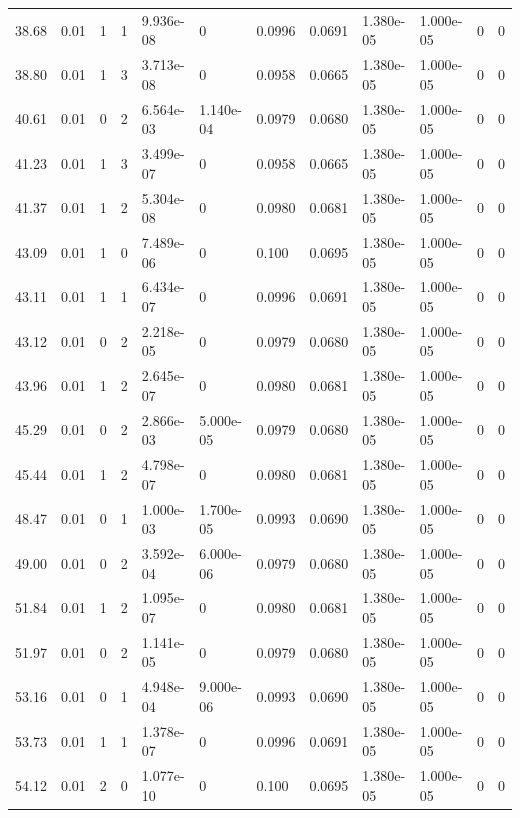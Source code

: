\documentclass[preview]{standalone}
\begin{document}
{{{\begin{tabular}{L{1.2cm}C{1.2cm} C{0.3cm}C{0.5cm} C{1.4cm}C{1.4cm} C{1.4cm}C{1.4cm} C{1.6cm}C{1.6cm} C{1.6cm}C{1.6cm}}
  38.68  &  0.01  & 1     &  1 &  9.936e-08  & 0  &  0.0996&   0.0691& 1.380e-05 & 1.000e-05   &  0 & 0  \\ 
  38.80  &  0.01  & 1     &  3 &  3.713e-08  & 0  &  0.0958&   0.0665& 1.380e-05 & 1.000e-05   &  0 & 0  \\ 
  40.61  &  0.01  & 0     &  2 &  6.564e-03  & 1.140e-04  &  0.0979&   0.0680& 1.380e-05 & 1.000e-05   &  0 & 0  \\ 
  41.23  &  0.01  & 1     &  3 &  3.499e-07  & 0  &  0.0958&   0.0665& 1.380e-05 & 1.000e-05   &  0 & 0  \\ 
  41.37  &  0.01  & 1     &  2 &  5.304e-08  & 0  &  0.0980&   0.0681& 1.380e-05 & 1.000e-05   &  0 & 0  \\ 
  43.09  &  0.01  & 1     &  0 &  7.489e-06  & 0  &  0.100&   0.0695& 1.380e-05 & 1.000e-05   &  0 & 0  \\ 
  43.11  &  0.01  & 1     &  1 &  6.434e-07  & 0  &  0.0996&   0.0691& 1.380e-05 & 1.000e-05   &  0 & 0  \\ 
  43.12  &  0.01  & 0     &  2 &  2.218e-05  & 0  &  0.0979&   0.0680& 1.380e-05 & 1.000e-05   &  0 & 0  \\ 
  43.96  &  0.01  & 1     &  2 &  2.645e-07  & 0  &  0.0980&   0.0681& 1.380e-05 & 1.000e-05   &  0 & 0  \\ 
  45.29  &  0.01  & 0     &  2 &  2.866e-03  & 5.000e-05  &  0.0979&   0.0680& 1.380e-05 & 1.000e-05   &  0 & 0  \\ 
  45.44  &  0.01  & 1     &  2 &  4.798e-07  & 0  &  0.0980&   0.0681& 1.380e-05 & 1.000e-05   &  0 & 0  \\ 
  48.47  &  0.01  & 0     &  1 &  1.000e-03  & 1.700e-05  &  0.0993&   0.0690& 1.380e-05 & 1.000e-05   &  0 & 0  \\ 
  49.00  &  0.01  & 0     &  2 &  3.592e-04  & 6.000e-06  &  0.0979&   0.0680& 1.380e-05 & 1.000e-05   &  0 & 0  \\ 
  51.84  &  0.01  & 1     &  2 &  1.095e-07  & 0  &  0.0980&   0.0681& 1.380e-05 & 1.000e-05   &  0 & 0  \\ 
  51.97  &  0.01  & 0     &  2 &  1.141e-05  & 0  &  0.0979&   0.0680& 1.380e-05 & 1.000e-05   &  0 & 0  \\ 
  53.16  &  0.01  & 0     &  1 &  4.948e-04  & 9.000e-06  &  0.0993&   0.0690& 1.380e-05 & 1.000e-05   &  0 & 0  \\ 
  53.73  &  0.01  & 1     &  1 &  1.378e-07  & 0  &  0.0996&   0.0691& 1.380e-05 & 1.000e-05   &  0 & 0  \\ 
  54.12  &  0.01  & 2     &  0 &  1.077e-10  & 0  &  0.100&   0.0695& 1.380e-05 & 1.000e-05   &  0 & 0  \\ 

\end{tabular}}}}
\end{document}

